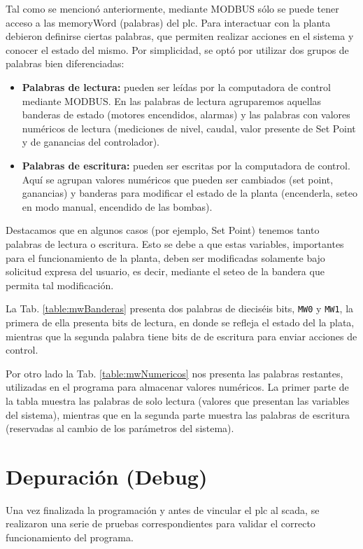 Tal como se mencionó anteriormente, mediante MODBUS sólo se puede tener acceso 
a las \gls{memoryWord} (palabras) del \gls{plc}.
Para interactuar con la planta debieron definirse ciertas palabras, que
permiten realizar acciones en el sistema y conocer el estado del mismo.
Por simplicidad, se optó por utilizar dos grupos de palabras bien
diferenciadas:
\begin{itemize}
 \item \textbf{Palabras de lectura:} pueden ser leídas por la computadora de
control mediante MODBUS. En las palabras de lectura agruparemos aquellas
banderas de estado (motores encendidos, alarmas) y las palabras con valores
numéricos de lectura (mediciones de nivel, caudal, valor presente de Set Point
y de ganancias del controlador).
 \item \textbf{Palabras de escritura:} pueden ser escritas por la computadora
de control. Aquí se agrupan valores numéricos que pueden ser cambiados (set
point, ganancias) y banderas para modificar el estado de la planta (encenderla,
seteo en modo manual, encendido de las bombas).
\end{itemize}

Destacamos que en algunos casos (por ejemplo, Set Point) tenemos tanto palabras
de lectura o escritura.
Esto se debe a que estas variables, importantes para el funcionamiento de la
planta, deben ser modificadas solamente bajo solicitud expresa del usuario, es
decir, mediante el seteo de la bandera que permita tal modificación.

La Tab. \ref{table:mwBanderas} presenta dos palabras de dieciséis
bits, \verb|MW0| y \verb|MW1|, la primera de ella presenta bits de lectura, en
donde se
refleja el estado del la plata, mientras que la segunda palabra tiene bits de
de escritura para enviar acciones de control.

Por otro lado la Tab. \ref{table:mwNumericos} nos presenta
las palabras restantes, utilizadas en el programa para
almacenar valores numéricos.
La primer parte de la tabla muestra las palabras de solo lectura (valores que
presentan las variables del sistema), mientras que en la
segunda parte muestra las palabras de escritura (reservadas al cambio
de los parámetros del sistema).

\section{Depuración (Debug)}
\label{sec:Debug}

Una vez finalizada la programación y antes de vincular el \gls{plc}
al \gls{scada}, se realizaron una serie de pruebas correspondientes para
validar el correcto funcionamiento del programa.

